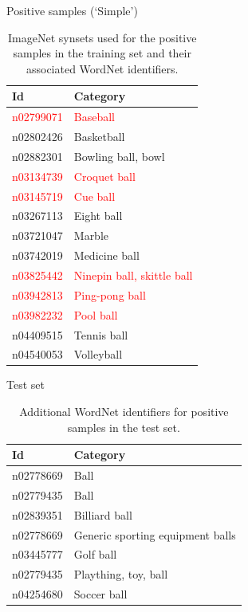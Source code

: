 \documentclass{beamer}
\newcommand{\scarequotes}[1]{`#1'}
\begin{document}
\begin{frame}{Positive samples (\scarequotes{Simple})}
	\begin{table}[H]
		\footnotesize
		\centering
		\caption{ImageNet synsets used for the positive samples in the training set and their associated WordNet \citep{fellbaum1998wordnet} identifiers.}
		\label{tab:postraining}
		\begin{tabularx}{\textwidth}{lX}
			\toprule
			\textbf{Id} & \textbf{Category} \\
			\midrule
			\textcolor{red}{n02799071} & \textcolor{red}{Baseball} \\
			n02802426 & Basketball \\
			n02882301 & Bowling ball, bowl \\
			\textcolor{red}{n03134739} & \textcolor{red}{Croquet ball} \\
			\textcolor{red}{n03145719} & \textcolor{red}{Cue ball} \\
			n03267113 & Eight ball \\
			n03721047 & Marble \\
			n03742019 & Medicine ball \\
			\textcolor{red}{n03825442} & \textcolor{red}{Ninepin ball, skittle ball} \\
			\textcolor{red}{n03942813} & \textcolor{red}{Ping-pong ball} \\
			\textcolor{red}{n03982232} & \textcolor{red}{Pool ball} \\
			n04409515 & Tennis ball \\
			n04540053 & Volleyball \\
			\bottomrule
		\end{tabularx}
	\end{table}
\end{frame}

\begin{frame}{Test set}
	\begin{table}[H]
		\centering
		\caption{Additional WordNet identifiers for positive samples in the test set.}
		\label{tab:postest}
		\begin{tabularx}{\textwidth}{lX}
			\toprule
			\textbf{Id} & \textbf{Category} \\
			\midrule
				n02778669 & Ball \\
				n02779435 & Ball \\
				n02839351 & Billiard ball \\
				n02778669 & Generic sporting equipment balls \\
				n03445777 & Golf ball \\
				n02779435 & Plaything, toy, ball \\
				n04254680 & Soccer ball \\
			\bottomrule
		\end{tabularx}
	\end{table}
\end{frame}
\end{document}
